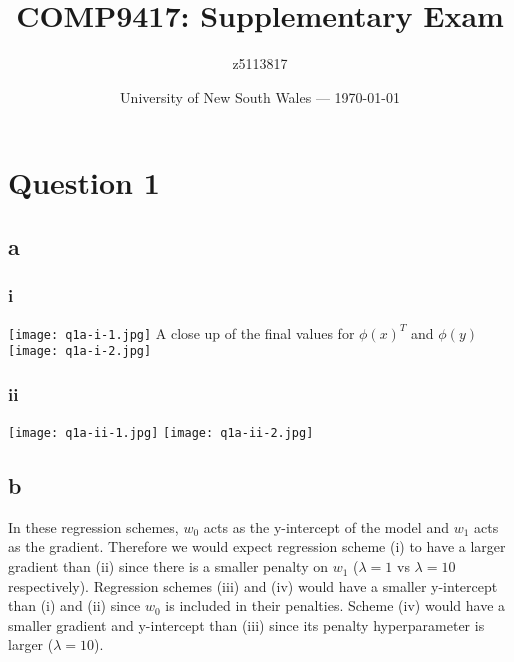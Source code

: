\documentclass{article}
\title{COMP9417: Supplementary Exam} %
\author{z5113817} %
\date{University of New South Wales --- \today} %
\begin{document}




\section*{Question 1}

\subsection*{a}

\subsubsection*{i}
\texttt{[image: q1a-i-1.jpg]}
\newpage
A close up of the final values for \(\phi(x)^{T}\) and \(\phi(y)\)\\
\texttt{[image: q1a-i-2.jpg]}

\newpage
\subsubsection*{ii}
\texttt{[image: q1a-ii-1.jpg]}
\newpage
\texttt{[image: q1a-ii-2.jpg]}

\subsection*{b}

In these regression schemes, \(w_{0}\) acts as the y-intercept of the model and \(w_{1}\) acts as the gradient. Therefore we would expect 
regression scheme (i) to have a larger gradient than (ii) since there is a smaller penalty on \(w_{1}\) (\(\lambda = 1\) vs \(\lambda = 10\) respectively).
Regression schemes (iii) and (iv) would have a smaller y-intercept than (i) and (ii) since \(w_{0}\) is included in their penalties. Scheme (iv) would have 
a smaller gradient and y-intercept than (iii) since its penalty hyperparameter is larger (\(\lambda = 10\)).\\
\end{document}
